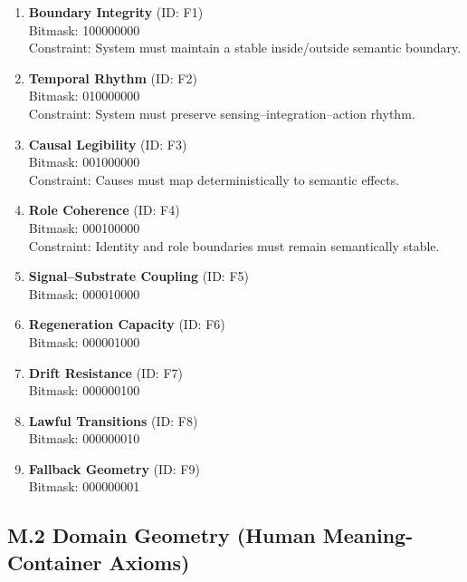 \begin{enumerate}
    \item \textbf{Boundary Integrity} \hfill (ID: F1) \\
    Bitmask: 100000000 \\
    Constraint: System must maintain a stable inside/outside semantic boundary.

    \item \textbf{Temporal Rhythm} \hfill (ID: F2) \\
    Bitmask: 010000000 \\
    Constraint: System must preserve sensing–integration–action rhythm.

    \item \textbf{Causal Legibility} \hfill (ID: F3) \\
    Bitmask: 001000000 \\
    Constraint: Causes must map deterministically to semantic effects.

    \item \textbf{Role Coherence} \hfill (ID: F4) \\
    Bitmask: 000100000 \\
    Constraint: Identity and role boundaries must remain semantically stable.

    \item \textbf{Signal–Substrate Coupling} \hfill (ID: F5) \\
    Bitmask: 000010000

    \item \textbf{Regeneration Capacity} \hfill (ID: F6) \\
    Bitmask: 000001000

    \item \textbf{Drift Resistance} \hfill (ID: F7) \\
    Bitmask: 000000100

    \item \textbf{Lawful Transitions} \hfill (ID: F8) \\
    Bitmask: 000000010

    \item \textbf{Fallback Geometry} \hfill (ID: F9) \\
    Bitmask: 000000001
\end{enumerate}

\subsection*{M.2 Domain Geometry (Human Meaning-Container Axioms)}

